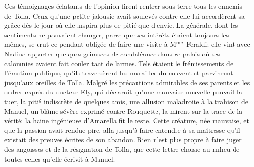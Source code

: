 {{}} Ces témoignages éclatants de l'opinion firent rentrer sous terre tous les ennemis de Tolla. Ceux qu'une petite jalousie avait soulevés contre elle lui accordèrent sa grâce dès le jour où elle inspira plus de pitié que d'envie. La générale, dont les sentiments ne pouvaient changer, parce que ses intérêts étaient toujours les mêmes, se crut ce pendant obligée de faire une visite à M$\textsuperscript{me}$ Feraldi: elle vint avec Nadine apporter quelques grimaces de condoléance dans ce palais où ses calomnies avaient fait couler tant de larmes. Tels étaient le frémissements de l'émotion publique, qu'ils traversèrent les murailles du couvent et parvinrent jusqu'aux oreilles de Tolla. Malgré les précautions admirables de ses parents et les ordres exprès du docteur Ely, qui déclarait qu'une mauvaise nouvelle pouvait la tuer, la pitié indiscrète de quelques amis, une allusion maladroite à la trahison de Manuel, un blâme sévère exprimé contre Rouquette, la mirent sur la trace de la vérité: la haine ingénieuse d'Amarella fit le reste. Cette créature, née mauvaise, et que la passion avait rendue pire, alla jusqu'à faire entendre à sa maîtresse qu'il existait des preuves écrites de son abandon. Rien n'est plus propre à faire juger des angoisses et de la résignation de Tolla, que cette lettre choisie au milieu de toutes celles qu'elle écrivit à Manuel.
